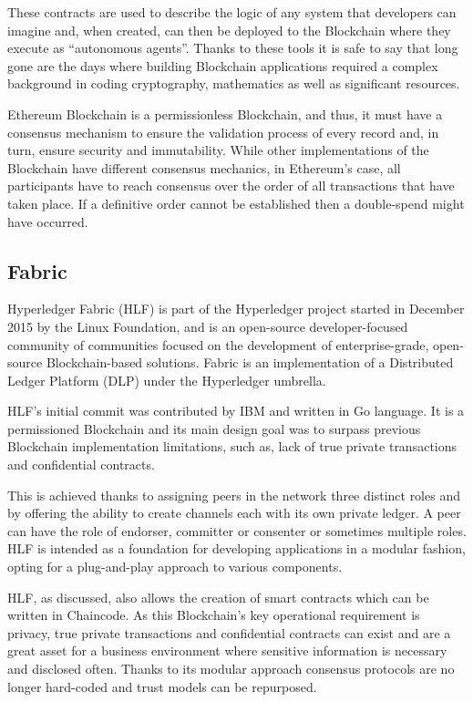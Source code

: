   These contracts are used to describe the logic of any system that developers
  can imagine and, when created, can then be deployed to the Blockchain where
  they execute as “autonomous agents”.  Thanks to these tools it is safe to say
  that long gone are the days where building Blockchain applications required a
  complex background in coding cryptography, mathematics as well as significant
  resources.\cite{Wood2017,BlockGeeks2017}

  Ethereum Blockchain is a permissionless Blockchain, and thus, it must have a
  consensus mechanism to ensure the validation process of every record and, in
  turn, ensure security and immutability. While other implementations of the
  Blockchain have different consensus mechanics, in Ethereum’s case, all
  participants have to reach consensus over the order of all transactions that
  have taken place. If a definitive order cannot be established then a
  double-spend might have occurred.

  \subsection{Fabric}

  Hyperledger Fabric (HLF) is part of the
  Hyperledger project started
  in December 2015 by the Linux Foundation, and is an open-source
  developer-focused community of communities focused on the development of
  enterprise-grade, open-source Blockchain-based solutions.  Fabric is an
  implementation of a Distributed Ledger Platform (DLP) under the Hyperledger
  umbrella.  \cite{Cachin2016}

  HLF’s initial commit was contributed by IBM and written in Go language.  It is
  a permissioned Blockchain and its main design goal was to surpass previous
  Blockchain implementation limitations, such as, lack of true private
  transactions and confidential contracts.

  This is achieved thanks to assigning peers in the network three distinct roles
  and by offering the ability to create channels each with its own private
  ledger.  A peer can have the role of endorser, committer or consenter or
  sometimes multiple roles.  HLF is intended as a foundation for developing
  applications in a modular fashion, opting for a plug-and-play approach to
  various components. \cite{HyperledgerFabricDocs2017}

  HLF, as discussed, also allows the creation of smart contracts which can be
  written in Chaincode.  As this Blockchain's key operational requirement is
  privacy, true private transactions and confidential contracts can exist and are
  a great asset for a business environment where sensitive information is
  necessary and disclosed often.  Thanks to its modular approach consensus
  protocols are no longer hard-coded and trust models can be repurposed.

